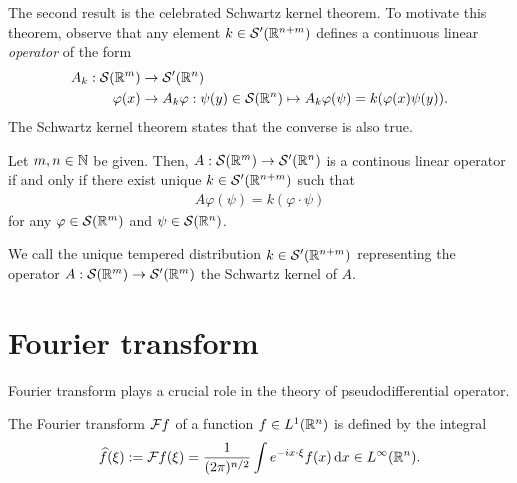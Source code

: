 \documentclass[12pt]{article}
\begin{document}
The second result is the celebrated Schwartz kernel theorem. To motivate this theorem, observe that any element $k \in \sch'(\R^{n + m})$ defines a continuous linear \textit{operator} of the form 
\begin{align*}
A_k : \sch(\R^m) &\to \sch'(\R^n)\\
\varphi(x) &\to A_k \varphi : \psi(y) \in \sch(\R^n) \mapsto A_k \varphi (\psi) = k(\varphi(x) \psi(y)). 
\end{align*}
The Schwartz kernel theorem states that the converse is also true. 
\begin{ftheorem}
    Let $m, n \in \N$ be given. Then, $A : \sch(\R^m) \to \sch'(\R^n)$ is a continous linear operator if and only if there exist unique $k \in \sch'(\R^{n + m})$ such that 
    \begin{align*}
    A\varphi(\psi) = k(\varphi \cdot \psi)
    \end{align*}
    for any $\varphi \in \sch(\R^m)$ and $\psi \in \sch(\R^n)$. 
\end{ftheorem}

We call the unique tempered distribution $k \in \sch'(\R^{n + m})$ representing the operator $A: \sch(\R^m) \to \sch'(\R^m)$ the Schwartz kernel of $A$. 


%    


\section{Fourier transform} 
Fourier transform plays a crucial role in the theory of pseudodifferential operator.
\begin{fdefinition}
    The Fourier transform $\F f$ of a function $f \in L^1(\R^n)$ is defined by the integral
    \begin{align*}
    \widehat{f}(\xi) := \F f(\xi) = \frac{1}{(2\pi)^{n/2}} \int e^{- i x \cdot \xi} f(x)\d[x] \in L^\infty(\R^n). 
    \end{align*}
\end{fdefinition}
    
\end{document}
